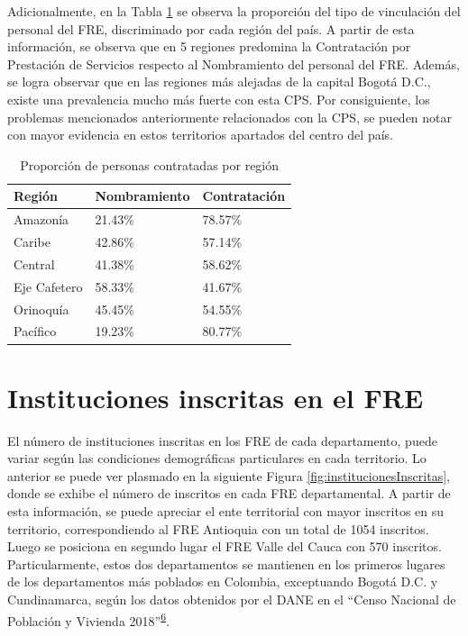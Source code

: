 \documentclass[
]{book}
\begin{document}
Adicionalmente, en la Tabla \ref{tab:CaracterizacionIngreso1} se observa la proporción del tipo de vinculación del personal del FRE, discriminado por cada región del país. A partir de esta información, se observa que en 5 regiones predomina la Contratación por Prestación de Servicios respecto al Nombramiento del personal del FRE. Además, se logra observar que en las regiones más alejadas de la capital Bogotá D.C., existe una prevalencia mucho más fuerte con esta CPS. Por consiguiente, los problemas mencionados anteriormente relacionados con la CPS, se pueden notar con mayor evidencia en estos territorios apartados del centro del país.

\begin{table}

\caption{\label{tab:CaracterizacionIngreso1}Proporción de personas contratadas por región}
\centering
\begin{tabular}[t]{lll}
\toprule
Región & Nombramiento & Contratación\\
\midrule
Amazonía & 21.43\% & 78.57\%\\
Caribe & 42.86\% & 57.14\%\\
Central & 41.38\% & 58.62\%\\
Eje Cafetero & 58.33\% & 41.67\%\\
Orinoquía & 45.45\% & 54.55\%\\
\addlinespace
Pacífico & 19.23\% & 80.77\%\\
\bottomrule
\end{tabular}
\end{table}

\hypertarget{instituciones-inscritas-en-el-fre}{%
\section{Instituciones inscritas en el FRE}\label{instituciones-inscritas-en-el-fre}}

El número de instituciones inscritas en los FRE de cada departamento, puede variar según las condiciones demográficas particulares en cada territorio. Lo anterior se puede ver plasmado en la siguiente Figura \ref{fig:institucionesInscritas}, donde se exhibe el número de inscritos en cada FRE departamental. A partir de esta información, se puede apreciar el ente territorial con mayor inscritos en su territorio, correspondiendo al FRE Antioquia con un total de 1054 inscritos. Luego se posiciona en segundo lugar el FRE Valle del Cauca con 570 inscritos. Particularmente, estos dos departamentos se mantienen en los primeros lugares de los departamentos más poblados en Colombia, exceptuando Bogotá D.C. y Cundinamarca, según los datos obtenidos por el DANE en el ``Censo Nacional de Población y Vivienda 2018''\textsuperscript{\protect\hyperlink{ref-DANE2021}{6}}.
\end{document}
